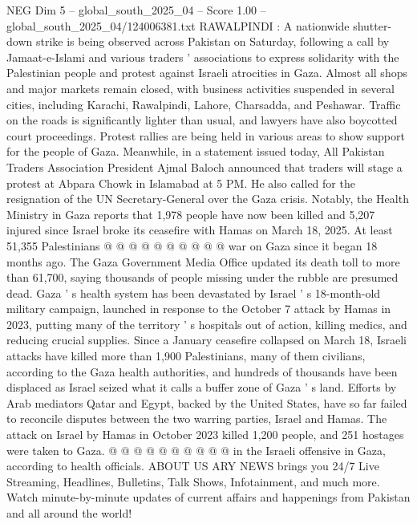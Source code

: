 \begin{textsample}{NEG Dim 5 – global\_south\_2025\_04 – Score 1.00 – global\_south\_2025\_04/124006381.txt}  \label{ex:f5_neg_370}
RAWALPINDI : A nationwide shutter-down strike is being observed across Pakistan on Saturday, following a call by Jamaat-e-Islami and various traders ' associations to express solidarity with the Palestinian people and protest against Israeli atrocities in Gaza.
Almost all shops and major markets remain closed, with business activities suspended in several cities, including Karachi, Rawalpindi, Lahore, Charsadda, and Peshawar.
Traffic on the roads is significantly lighter than usual, and lawyers have also boycotted court proceedings.
Protest rallies are being held in various areas to show support for the people of Gaza.
Meanwhile, in a statement issued today, All Pakistan Traders Association President Ajmal Baloch announced that traders will stage a protest at Abpara Chowk in Islamabad at 5 PM.
He also called for the resignation of the UN Secretary-General over the Gaza crisis.
Notably, the Health Ministry in Gaza reports that 1,978 people have now been killed and 5,207 injured since Israel broke its ceasefire with Hamas on March 18, 2025.
At least 51,355 Palestinians @ @ @ @ @ @ @ @ @ @ war on Gaza since it began 18 months ago.
The Gaza Government Media Office updated its death toll to more than 61,700, saying thousands of people missing under the rubble are presumed dead.
Gaza ' s health system has been devastated by Israel ' s 18-month-old military campaign, launched in response to the October 7 attack by Hamas in 2023, putting many of the territory ' s hospitals out of action, killing medics, and reducing crucial supplies.
Since a January ceasefire collapsed on March 18, Israeli attacks have killed more than 1,900 Palestinians, many of them civilians, according to the Gaza health authorities, and hundreds of thousands have been displaced as Israel seized what it calls a buffer zone of Gaza ' s land.
Efforts by Arab mediators Qatar and Egypt, backed by the United States, have so far failed to reconcile disputes between the two warring parties, Israel and Hamas.
The attack on Israel by Hamas in October 2023 killed 1,200 people, and 251 hostages were taken to Gaza. @ @ @ @ @ @ @ @ @ @ in the Israeli offensive in Gaza, according to health officials.
ABOUT US ARY NEWS brings you 24/7 Live Streaming, Headlines, Bulletins, Talk Shows, Infotainment, and much more.
Watch minute-by-minute updates of current affairs and happenings from Pakistan and all around the world!

\end{textsample}
